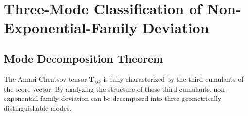 \documentclass[12pt,a4paper]{article}
\theoremstyle{plain}
\theoremstyle{definition}
\theoremstyle{remark}
\newcommand{\ACT}{\mathbf{T}}    %
\begin{document}
\section{Three-Mode Classification of Non-Exponential-Family Deviation}
\label{sec:three_modes}

\subsection{Mode Decomposition Theorem}

The Amari-Chentsov tensor $\ACT_{ijk}$ is fully characterized by the third cumulants of the score vector. By analyzing the structure of these third cumulants, non-exponential-family deviation can be decomposed into three geometrically distinguishable modes.
\end{document}
